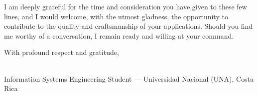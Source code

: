 \documentclass[11pt]{article}
\begin{document}
I am deeply grateful for the time and consideration you have given to these few lines, and I
would welcome, with the utmost gladness, the opportunity to contribute to the quality and
craftsmanship of your applications. Should you find me worthy of a conversation, I remain
ready and willing at your command.

\vspace{8pt}
With profound respect and gratitude,

\vspace{16pt}
{\color{cvprimary}\bfseries \MyName}\\
{\color{cvlight}\small Information Systems Engineering Student --- Universidad Nacional (UNA), Costa Rica}
\end{document}
